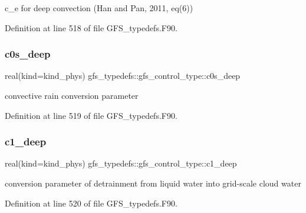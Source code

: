 c\+\_\+e for deep convection (Han and Pan, 2011, eq(6)) 



Definition at line 518 of file G\+F\+S\+\_\+typedefs.\+F90.

\mbox{\label{structgfs__typedefs_1_1gfs__control__type_a862526f5912fec4f56be794e2a83ed73}} 
\subsubsection{c0s\+\_\+deep}
{\footnotesize\ttfamily real(kind=kind\+\_\+phys) gfs\+\_\+typedefs\+::gfs\+\_\+control\+\_\+type\+::c0s\+\_\+deep}



convective rain conversion parameter 



Definition at line 519 of file G\+F\+S\+\_\+typedefs.\+F90.

\mbox{\label{structgfs__typedefs_1_1gfs__control__type_a5b1ee74da85e3b80b525d94ebf5c8ccb}} 
\subsubsection{c1\+\_\+deep}
{\footnotesize\ttfamily real(kind=kind\+\_\+phys) gfs\+\_\+typedefs\+::gfs\+\_\+control\+\_\+type\+::c1\+\_\+deep}



conversion parameter of detrainment from liquid water into grid-\/scale cloud water 



Definition at line 520 of file G\+F\+S\+\_\+typedefs.\+F90.

\mbox{\label{structgfs__typedefs_1_1gfs__control__type_ad4545adbd0cf7430e288f69f9f1a6dad}} 
